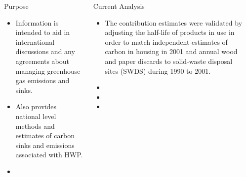 \documentclass[final]{beamer}\usepackage[]{graphicx}\usepackage[]{color}
\newlength{\sepwid}
\newlength{\onecolwid}
\newlength{\twocolwid}
\begin{document}
\begin{frame}[t]
\begin{columns}[t]
\begin{column}{\sepwid}\end{column} %

\begin{column}{\twocolwid} %

\begin{columns}[t,totalwidth=\twocolwid] %

\begin{column}{\onecolwid}\vspace{-.6in} %


\begin{block}{Purpose}
\vspace{0ex}
\begin{itemize}
\item Information is intended to aid in international discussions and any agreements about managing greenhouse gas emissions and sinks.
\item Also provides national level methods and estimates of carbon sinks and emissions associated with HWP.
\item
\end{itemize}
\vspace{-1.5ex}
\end{block}


\end{column} %

\begin{column}{\onecolwid}\vspace{-.6in} %


\begin{block}{Current Analysis}
\vspace{0ex}
\begin{itemize}
\item The contribution estimates were validated by adjusting the half-life of products in use in order to match independent estimates of carbon in housing in 2001 and annual wood and paper discards to solid-waste disposal sites (SWDS) during 1990 to 2001. 
\item
\item
\item
\end{itemize}
\end{block}


\end{column}
\end{columns}
\end{column}
\end{columns}
\end{frame}
\end{document}
